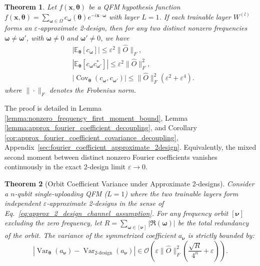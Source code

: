 \documentclass[%
 reprint,
 amsmath,amssymb,
 aps,
 pra,
]{revtex4-2}
\newtheorem{theorem}{Theorem}
\theoremstyle{definition}
\begin{document}
\begin{theorem}
\label{theorem:distinct_frequency_properties}
Let \(f(\bm{x},\bm{\theta})\) be a QFM hypothesis function \(f(\boldsymbol{x},\boldsymbol{\theta})=\sum_{\boldsymbol{\omega}\in\Omega}
c_{\boldsymbol{\omega}}(\boldsymbol{\theta}) e^{-i\boldsymbol{x}\cdot\boldsymbol{\omega}}\) with layer $L=1$. If each trainable layer \(W^{(l)}\) forms an \(\varepsilon\)-approximate 2-design, then for any two distinct nonzero frequencies \(\bm{\omega}\neq\bm{\omega}'\), with \(\bm{\omega}\neq0\) and \(\bm{\omega}'\neq0\), we have
\begin{align}
&\left|
\mathbb{E}_{\bm{\theta}}
\left[
c_{\bm{\omega}}
\right]
\right|
\leq
\varepsilon^2\|\hat O\|_F,\\
&\left|
\mathbb{E}_{\bm{\theta}}
\left[
c_{\bm{\omega}}c_{\bm{\omega}'}^*
\right]
\right|
\leq
\varepsilon^2
\|\hat O\|_F^2,\\
&\left|
\operatorname{Cov}_{\bm{\theta}}
\left(
c_{\bm{\omega}},c_{\bm{\omega}'}
\right)
\right|
\leq
\|\hat O\|_F^2
\left(
\varepsilon^2+\varepsilon^4
\right).
\end{align}
where  \(\|\cdot\|_{F}\) denotes the Frobenius norm.
\end{theorem}

The proof is detailed in Lemma \ref{lemma:nonzero_frequency_first_moment_bound}, Lemma \ref{lemma:approx_fourier_coefficient_decoupling}, and Corollary \ref{cor:approx_fourier_coefficient_covariance_decoupling}, Appendix~\ref{sec:fourier_coefficient_approximate_2design}. Equivalently, the mixed second moment between distinct nonzero Fourier coefficients vanishes continuously in the exact 2-design limit \(\varepsilon\to0\).

\begin{theorem}[Orbit Coefficient Variance under Approximate 2-designs]
\label{theorem:tight_approx_exp_variance}
Consider a $n$-qubit single-uploading QFM ($L=1$) where the two trainable layers form independent $\varepsilon$-approximate 2-designs in the sense of Eq.~\eqref{eq:approx_2_design_channel_assumption}. For any frequency orbit $[\bm{\nu}]$ excluding the zero frequency, let $R =\sum_{\bm{\omega}\in[\bm{\nu}]}\left|\mathfrak R(\bm{\omega})\right|$ be the total redundancy of the orbit. The variance of the symmetrized coefficient $a_{\bm{\nu}}$ is strictly bounded by:
\begin{equation}
\label{eq:exact_tight_bound}
\left|
\operatorname{Var}_{\bm{\theta}}(a_{\bm{\nu}})
-
\operatorname{Var}_{\text{2-design}}(a_{\bm{\nu}})
\right|
\in
\mathcal{O}\left( \varepsilon \|\hat{O}\|_F^2 \left( \frac{\sqrt{R}}{4^n} + \varepsilon \right) \right).
\end{equation}

\end{theorem}
\end{document}

